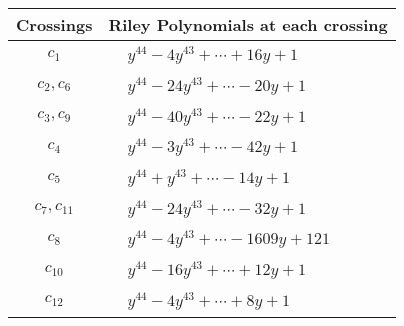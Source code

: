 \documentclass[1p]{elsarticle_modified}
\theoremstyle{definition}
\begin{document}
\begin{tabular}{m{50pt}|m{274pt}}
Crossings & \hspace{64pt}Riley Polynomials at each crossing \\
\hline $$\begin{aligned}c_{1}\end{aligned}$$&$\begin{aligned}
&y^{44}-4 y^{43}+\cdots+16 y+1
\end{aligned}$\\
\hline $$\begin{aligned}c_{2},c_{6}\end{aligned}$$&$\begin{aligned}
&y^{44}-24 y^{43}+\cdots-20 y+1
\end{aligned}$\\
\hline $$\begin{aligned}c_{3},c_{9}\end{aligned}$$&$\begin{aligned}
&y^{44}-40 y^{43}+\cdots-22 y+1
\end{aligned}$\\
\hline $$\begin{aligned}c_{4}\end{aligned}$$&$\begin{aligned}
&y^{44}-3 y^{43}+\cdots-42 y+1
\end{aligned}$\\
\hline $$\begin{aligned}c_{5}\end{aligned}$$&$\begin{aligned}
&y^{44}+y^{43}+\cdots-14 y+1
\end{aligned}$\\
\hline $$\begin{aligned}c_{7},c_{11}\end{aligned}$$&$\begin{aligned}
&y^{44}-24 y^{43}+\cdots-32 y+1
\end{aligned}$\\
\hline $$\begin{aligned}c_{8}\end{aligned}$$&$\begin{aligned}
&y^{44}-4 y^{43}+\cdots-1609 y+121
\end{aligned}$\\
\hline $$\begin{aligned}c_{10}\end{aligned}$$&$\begin{aligned}
&y^{44}-16 y^{43}+\cdots+12 y+1
\end{aligned}$\\
\hline $$\begin{aligned}c_{12}\end{aligned}$$&$\begin{aligned}
&y^{44}-4 y^{43}+\cdots+8 y+1
\end{aligned}$\\
\hline
\end{tabular}\\~\\
\end{document}
